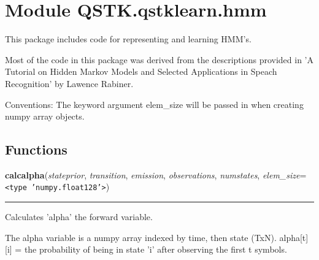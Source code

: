 %
%
%


\section{Module QSTK.qstklearn.hmm}

    \label{QSTK:qstklearn:hmm}
This package includes code for representing and learning HMM's.

Most of the code in this package was derived from the descriptions provided
in 'A Tutorial on Hidden Markov Models and Selected Applications in Speach 
Recognition' by Lawence Rabiner.

Conventions: The keyword argument elem\_size will be passed in when 
creating numpy array objects.



  \subsection{Functions}

    \label{QSTK:qstklearn:hmm:calcalpha}

    \vspace{0.5ex}

\hspace{.8\funcindent}\begin{boxedminipage}{\funcwidth}

    \raggedright \textbf{calcalpha}(\textit{stateprior}, \textit{transition}, \textit{emission}, \textit{observations}, \textit{numstates}, \textit{elem\_size}={\tt {\textless}type 'numpy.float128'{\textgreater}})

    \vspace{-1.5ex}

    \rule{\textwidth}{0.5\fboxrule}
\setlength{\parskip}{2ex}
    Calculates 'alpha' the forward variable.

    The alpha variable is a numpy array indexed by time, then state (TxN). 
    alpha[t][i] = the probability of being in state 'i' after observing the
    first t symbols.

\setlength{\parskip}{1ex}
    \end{boxedminipage}

